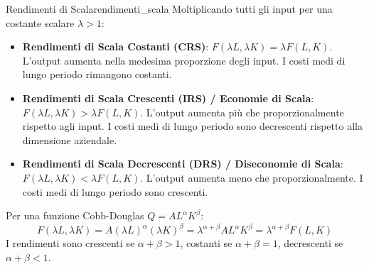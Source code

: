 \begin{definizione}{Rendimenti di Scala}{rendimenti_scala}
Moltiplicando tutti gli input per una costante scalare $\lambda > 1$:
\begin{itemize}
    \item \textbf{Rendimenti di Scala Costanti (CRS)}: $F(\lambda L, \lambda K) = \lambda F(L, K)$. L'output aumenta nella medesima proporzione degli input. I costi medi di lungo periodo rimangono costanti.
    \item \textbf{Rendimenti di Scala Crescenti (IRS) / Economie di Scala}: $F(\lambda L, \lambda K) > \lambda F(L, K)$. L'output aumenta più che proporzionalmente rispetto agli input. I costi medi di lungo periodo sono decrescenti rispetto alla dimensione aziendale.
    \item \textbf{Rendimenti di Scala Decrescenti (DRS) / Diseconomie di Scala}: $F(\lambda L, \lambda K) < \lambda F(L, K)$. L'output aumenta meno che proporzionalmente. I costi medi di lungo periodo sono crescenti.
\end{itemize}
Per una funzione Cobb-Douglas $Q = A L^\alpha K^\beta$:
\begin{equation}
    F(\lambda L, \lambda K) = A (\lambda L)^\alpha (\lambda K)^\beta = \lambda^{\alpha + \beta} A L^\alpha K^\beta = \lambda^{\alpha + \beta} F(L, K)
\end{equation}
I rendimenti sono crescenti se $\alpha + \beta > 1$, costanti se $\alpha + \beta = 1$, decrescenti se $\alpha + \beta < 1$.
\end{definizione}

